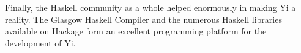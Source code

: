 \documentclass[9pt,indentedstyle,preprint]{sigplanconf}
\begin{document}
Finally, the Haskell community as a whole helped enormously in making Yi a
reality. The Glasgow Haskell Compiler and the numerous Haskell libraries
available on Hackage \cite{Hackage} form an excellent programming platform for
the development of Yi.



\end{document}
